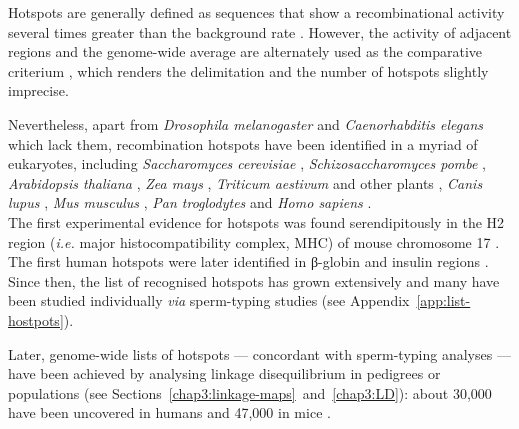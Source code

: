 Hotspots are generally defined as sequences that show a recombinational activity several times greater than the background rate \citep{crawford2004evidence,stapley2017variation}. 
However, the activity of adjacent regions and the genome-wide average are alternately used as the comparative criterium \citep{demassy2013initiation}, which renders the delimitation and the number of hotspots slightly imprecise.

Nevertheless, apart from \textit{Drosophila melanogaster} \citep{comeron2012many,manzano-winkler2013how} and \textit{Caenorhabditis elegans} \citep{kaur2014crossover} which lack them, recombination hotspots have been identified in a myriad of eukaryotes, including \textit{Saccharomyces cerevisiae} \citep{sun1989doublestrand,lichten1995meiotic}, \textit{Schizosaccharomyces pombe} \citep{steiner2005natural,cromie2007discrete}, \textit{Arabidopsis thaliana} \citep{drouaud2006variation}, \textit{Zea mays} \citep{brown1991recombination,dooner1997recombination,yao2002molecular,fu2002recombination}, \textit{Triticum aestivum} \citep{saintenac2011variation} and other plants \citep{mezard2006meiotic}, \textit{Canis lupus} \citep{axelsson2012death}, \textit{Mus musculus} \citep{guillon2002initiation,kauppi2007meiotic,smagulova2011genomewide}, \textit{Pan troglodytes} \citep{winckler2005comparison,auton2012finescale} and \textit{Homo sapiens} \citep{jeffreys2001intensely,myers2005finescale}.\\



The first experimental evidence for hotspots was found serendipitously in the H2 region (\textit{i.e.} major histocompatibility complex, MHC) of mouse chromosome 17 \citep{steinmetz1982molecular}.
The first human hotspots were later identified in \textgreek{β}-globin and insulin regions \citep{chakravarti1984nonuniform,chakravarti1986evidence}. 
Since then, the list of recognised hotspots has grown extensively \citep[reviewed in][]{arnheim2007mammalian,paigen2010mammalian} and many have been studied individually \textit{via} sperm-typing studies \citep[e.g.\ ][]{hubert1994high,jeffreys2001intensely,schneider2002direct} (see Appendix~\ref{app:list-hostpots}).

Later, genome-wide lists of hotspots — concordant with sperm-typing analyses \citep[e.g.][]{tiemann-boege2006highresolution} — have been achieved by analysing linkage disequilibrium in pedigrees or populations (see Sections~\ref{chap3:linkage-maps}~and~\ref{chap3:LD}): about 30,000 have been uncovered in humans \citep{myers2005finescale,theinternationalhapmapconsortium2007seconda} and 47,000 in mice \citep{brunschwig2012finescale}.\\


